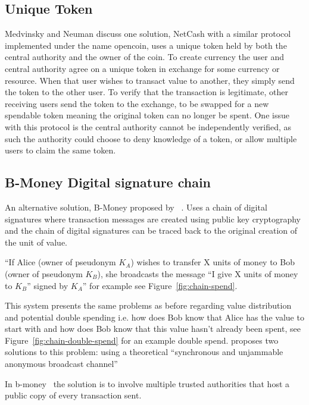 \subsection{Unique Token} Medvinsky and Neuman\cite{netcash} discuss one solution,
NetCash with a similar protocol implemented under the name opencoin, uses a
unique token held by both the central authority and the owner of the coin. To
create currency the user and central authority agree on a unique token in
exchange for some currency or resource. When that user wishes to transact value
to another, they simply send the token to the other user.  To verify that the
transaction is legitimate, other receiving users send the token to the exchange,
to be swapped for a new spendable token meaning the original token can no longer
be spent. One issue with this protocol is the central authority cannot be
independently verified, as such the authority could choose to deny knowledge of
a token, or allow multiple users to claim the same token.

\subsection{B-Money Digital signature chain}\label{digital-sig}
An alternative solution, B-Money proposed by ~\textcite{b-money}. Uses a chain of digital signatures where transaction messages are created using public key cryptography and the chain of digital signatures can be traced back to the original creation of the unit of value.

``If Alice (owner of pseudonym $K_A$) wishes to transfer X units of money to Bob (owner of pseudonym $K_B$), she broadcasts the message ``I give X units of money to $K_B$'' signed by $K_A$'' for example see Figure~\ref{fig:chain-spend}.

This system presents the same problems as before regarding value distribution and potential double spending i.e. how does Bob know that Alice has the value to start with and how does Bob know that this value hasn't already been spent, see Figure~\ref{fig:chain-double-spend} for an example double spend. \textcite{b-money} proposes two solutions to this problem: using a theoretical ``synchronous and unjammable anonymous broadcast channel''

In b-money~\cite{b-money} the solution is to involve multiple trusted authorities that host a public copy of every transaction sent.

